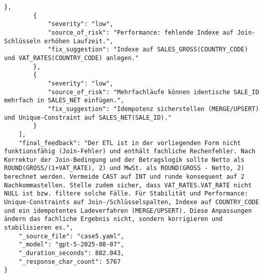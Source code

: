 \begin{lstlisting}[caption={Ausgabe: GPT-5 Anwendungsfall 5 Robustheitsdurchlauf},label={gpt_case5_prompt3}]
        },
        {
            "severity": "low",
            "source_of_risk": "Performance: fehlende Indexe auf Join-Schlüsseln erhöhen Laufzeit.",
            "fix_suggestion": "Indexe auf SALES_GROSS(COUNTRY_CODE) und VAT_RATES(COUNTRY_CODE) anlegen."
        },
        {
            "severity": "low",
            "source_of_risk": "Mehrfachläufe können identische SALE_ID mehrfach in SALES_NET einfügen.",
            "fix_suggestion": "Idempotenz sicherstellen (MERGE/UPSERT) und Unique-Constraint auf SALES_NET(SALE_ID)."
        }
    ],
    "final_feedback": "Der ETL ist in der vorliegenden Form nicht funktionsfähig (Join-Fehler) und enthält fachliche Rechenfehler. Nach Korrektur der Join-Bedingung und der Betragslogik sollte Netto als ROUND(GROSS/(1+VAT_RATE), 2) und MwSt. als ROUND(GROSS - Netto, 2) berechnet werden. Vermeide CAST auf INT und runde konsequent auf 2 Nachkommastellen. Stelle zudem sicher, dass VAT_RATES.VAT_RATE nicht NULL ist bzw. filtere solche Fälle. Für Stabilität und Performance: Unique-Constraints auf Join-/Schlüsselspalten, Indexe auf COUNTRY_CODE und ein idempotentes Ladeverfahren (MERGE/UPSERT). Diese Anpassungen ändern das fachliche Ergebnis nicht, sondern korrigieren und stabilisieren es.",
    "_source_file": "case5.yaml",
    "_model": "gpt-5-2025-08-07",
    "_duration_seconds": 882.043,
    "_response_char_count": 5767
}
\end{lstlisting}

